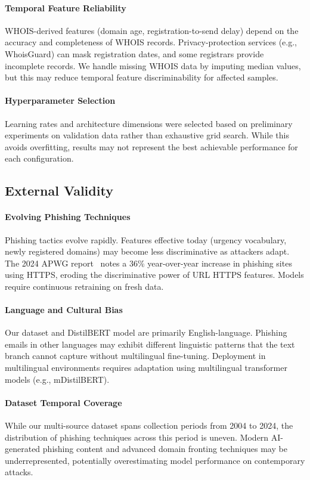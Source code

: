 \documentclass[conference]{IEEEtran}
\begin{document}
\paragraph{Temporal Feature Reliability}
WHOIS-derived features (domain age, registration-to-send delay) depend on
the accuracy and completeness of WHOIS records. Privacy-protection services
(e.g., WhoisGuard) can mask registration dates, and some registrars provide
incomplete records. We handle missing WHOIS data by imputing median values,
but this may reduce temporal feature discriminability for affected samples.

\paragraph{Hyperparameter Selection}
Learning rates and architecture dimensions were selected based on preliminary
experiments on validation data rather than exhaustive grid search. While
this avoids overfitting, results may not represent the best achievable
performance for each configuration.

\subsection{External Validity}
\label{subsec:external_threats}

\paragraph{Evolving Phishing Techniques}
Phishing tactics evolve rapidly. Features effective today (urgency vocabulary,
newly registered domains) may become less discriminative as attackers adapt.
The 2024 APWG report~\cite{apwg2023} notes a 36\% year-over-year increase in
phishing sites using HTTPS, eroding the discriminative power of URL HTTPS
features. Models require continuous retraining on fresh data.

\paragraph{Language and Cultural Bias}
Our dataset and DistilBERT model are primarily English-language. Phishing
emails in other languages may exhibit different linguistic patterns that
the text branch cannot capture without multilingual fine-tuning. Deployment
in multilingual environments requires adaptation using multilingual
transformer models (e.g., mDistilBERT).

\paragraph{Dataset Temporal Coverage}
While our multi-source dataset spans collection periods from 2004 to 2024,
the distribution of phishing techniques across this period is uneven.
Modern AI-generated phishing content and advanced domain fronting techniques
may be underrepresented, potentially overestimating model performance on
contemporary attacks.
\end{document}
